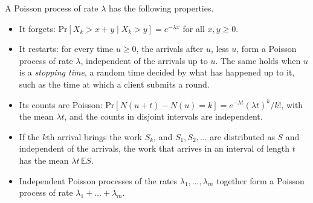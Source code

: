 \documentclass[handoutsbeamer.tex]{subfiles}
\begin{document}
\begin{frame}
\onp{\footnotesize}
\begin{propn}\label{propn:ch09:poisson}
A Poisson process of rate $\lambda$ has the following properties.
\begin{itemize}\setlength\itemsep{0.1em}
    \item[(a)] It forgets: $\mathrm{Pr}[X_k>x+y\mid X_k>y] = e^{-\lambda x}$ for all $x,y\ge0$.
    \item[(b)] It restarts: for every time $u\ge0$, the arrivals after $u$, less $u$, form a Poisson process of rate $\lambda$, independent of the arrivals up to $u$. The same holds when $u$ is a \emph{stopping time}, a random time decided by what has happened up to it, such as the time at which a client submits a round.
    \item[(c)] Its counts are Poisson: $\mathrm{Pr}[N(u+t)-N(u) = k] = e^{-\lambda t}(\lambda t)^k/k!$, with the mean $\lambda t$, and the counts in disjoint intervals are independent.
    \item[(d)] If the $k$th arrival brings the work $S_k$, and $S_1,S_2,\dots$ are distributed as $S$ and independent of the arrivals, the work that arrives in an interval of length $t$ has the mean $\lambda t\,\mathbb ES$.
    \item[(e)] Independent Poisson processes of the rates $\lambda_1,\dots,\lambda_m$ together form a Poisson process of rate $\lambda_1+\dots+\lambda_m$.
\end{itemize}
\end{propn}
\end{frame}
\end{document}
